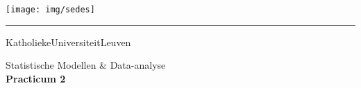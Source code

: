 \begin{titlepage}
    \newpage
    \thispagestyle{empty}
    \frenchspacing
    \hspace{-0.2cm}
    \texttt{[image: img/sedes]}
    \hspace{0.2cm}
    \rule{0.5pt}{4.2cm}
    \hspace{0.2cm}
    \begin{minipage}[b]{8cm}
        \Large{Katholieke\newline Universiteit\newline Leuven}\smallskip\newline
    \end{minipage}
    \vspace*{3.2cm}\vfill
    \begin{center}
        \begin{minipage}[t]{\textwidth}
            \begin{center}
            	\LARGE{\rm{Statistische Modellen \& Data-analyse}}\\[5mm]
                \LARGE{\rm{\textbf{Practicum 2}}}
            \end{center}
        \end{minipage}
    \end{center}
    \vfill
    \hfill{}
\end{titlepage}
